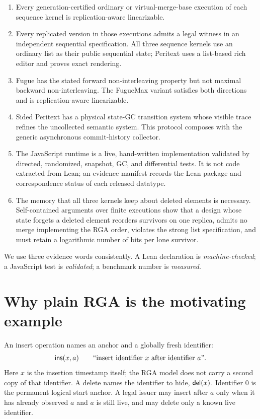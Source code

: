 \begin{enumerate}
\item Every generation-certified ordinary or virtual-merge-base execution of each
sequence kernel is replication-aware linearizable.
\item Every replicated version in those executions admits a legal witness in
an independent sequential specification. All three sequence kernels use an
ordinary list as their public sequential state; Peritext uses a list-based
rich editor and proves exact rendering.
\item Fugue has the stated forward non-interleaving property but not maximal
backward non-interleaving. The FugueMax variant satisfies both directions and
is replication-aware linearizable.
\item Sided Peritext has a physical state-GC transition system whose visible
trace refines the uncollected semantic system. This protocol composes with the
generic asynchronous commit-history collector.
\item The JavaScript runtime is a live, hand-written implementation validated
by directed, randomized, snapshot, GC, and differential tests. It is not code
extracted from Lean; an evidence manifest records the Lean package and
correspondence status of each released datatype.
\item The memory that all three kernels keep about deleted elements is
necessary. Self-contained arguments over finite executions show that a design
whose state forgets a deleted element reorders survivors on one replica,
admits no merge implementing the RGA order, violates the strong list
specification, and must retain a logarithmic number of bits per lone
survivor.
\end{enumerate}

We use three evidence words consistently. A Lean declaration is
\emph{machine-checked}; a JavaScript test is \emph{validated}; a benchmark
number is \emph{measured}.

\section{Why plain RGA is the motivating example}
\label{sec:motivation}

An insert operation names an anchor and a globally fresh identifier:
\[
  \mathsf{ins}(x,a) \qquad\text{``insert identifier $x$ after identifier $a$''}.
\]
Here $x$ is the insertion timestamp itself; the RGA model does not carry a
second copy of that identifier. A delete names the identifier to hide,
$\mathsf{del}(x)$. Identifier $0$ is the
permanent logical start anchor. A legal issuer may insert after $a$ only when
it has already observed $a$ and $a$ is still live, and may delete only a known
live identifier.

